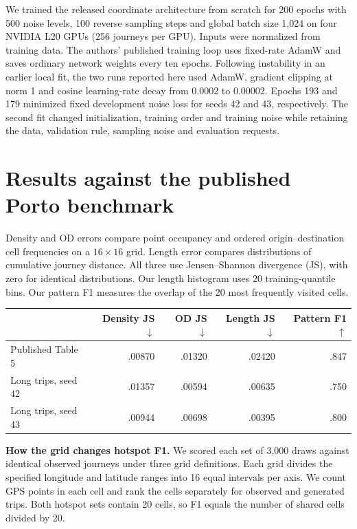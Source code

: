 \documentclass[11pt,a4paper]{article}
\begin{document}
We trained the released coordinate architecture from scratch for 200 epochs with 500 noise levels, 100 reverse sampling steps and global batch size 1,024 on four NVIDIA L20 GPUs (256 journeys per GPU). Inputs were normalized from training data. The authors' published training loop uses fixed-rate AdamW and saves ordinary network weights every ten epochs. Following instability in an earlier local fit, the two runs reported here used AdamW, gradient clipping at norm 1 and cosine learning-rate decay from 0.0002 to 0.00002. Epochs 193 and 179 minimized fixed development noise loss for seeds 42 and 43, respectively. The second fit changed initialization, training order and training noise while retaining the data, validation rule, sampling noise and evaluation requests.

\newpage
\section*{Results against the published Porto benchmark}
Density and OD errors compare point occupancy and ordered origin--destination cell frequencies on a $16\times16$ grid. Length error compares distributions of cumulative journey distance. All three use Jensen--Shannon divergence (JS), with zero for identical distributions. Our length histogram uses 20 training-quantile bins. Our pattern F1 measures the overlap of the 20 most frequently visited cells.

\begin{center}
\begin{tabular}{lrrrr}\toprule
 & Density JS $\downarrow$ & OD JS $\downarrow$ & Length JS $\downarrow$ & Pattern F1 $\uparrow$\\\midrule
Published Table 5 & .00870 & .01320 & .02420 & .847\\
Long trips, seed 42 & .01357 & .00594 & .00635 & .750\\
Long trips, seed 43 & .00944 & .00698 & .00395 & .800\\
\bottomrule\end{tabular}
\end{center}

\textbf{How the grid changes hotspot F1.} We scored each set of 3,000 draws against identical observed journeys under three grid definitions. Each grid divides the specified longitude and latitude ranges into 16 equal intervals per axis. We count GPS points in each cell and rank the cells separately for observed and generated trips. Both hotspot sets contain 20 cells, so F1 equals the number of shared cells divided by 20.
\end{document}

